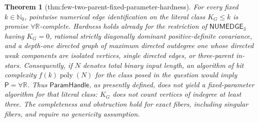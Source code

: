 \documentclass{article}
\newtheorem{theorem}{Theorem}
\begin{document}
\begin{theorem}[thm:few-two-parent-fixed-parameter-hardness]\label{thm:few-two-parent-fixed-parameter-hardness}
For every fixed \(k\in\mathbb N_0\), pointwise numerical edge identification on the literal class \(K_G\le k\) is promise \(\forall\mathbb R\)-complete.  Hardness holds already for the restriction of \(\mathsf{NUMEDGE}_3\) having \(K_G=0\), rational strictly diagonally dominant positive-definite covariance, and a depth-one directed graph of maximum directed outdegree one whose directed weak components are isolated vertices, single directed edges, or three-parent in-stars.  Consequently, if \(N\) denotes total binary input length, an algorithm of bit complexity \(f(k)\operatorname{poly}(N)\) for the class posed in the question would imply \(\mathsf P=\forall\mathbb R\).  Thus \(\mathsf{ParamHandle}\), as presently defined, does not yield a fixed-parameter algorithm for that literal class: \(K_G\) does not count vertices of indegree at least three.  The completeness and obstruction hold for exact fibers, including singular fibers, and require no genericity assumption.
\end{theorem}
\end{document}
